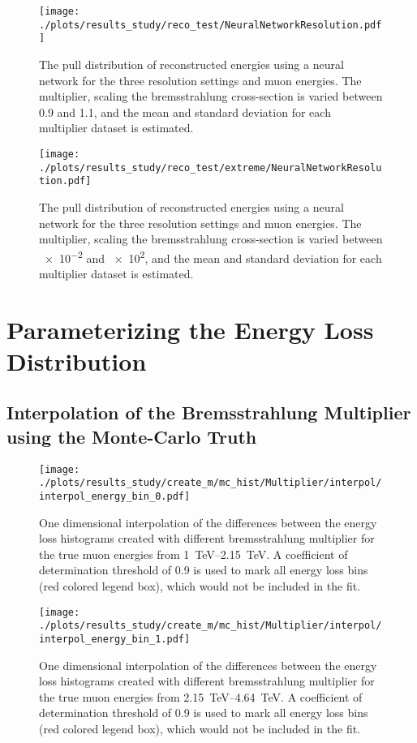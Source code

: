 \begin{figure}[H]
    \centering
    \texttt{[image: ./plots/results\_study/reco\_test/NeuralNetworkResolution.pdf]}
    \caption{The pull distribution of reconstructed energies using a neural network for the three resolution settings and muon energies. The multiplier, scaling the bremsstrahlung cross-section is varied between \num{0.9} and \num{1.1}, and the mean and standard deviation for each multiplier dataset is estimated.}
    \label{fig:study_ereco_pull_nn}
\end{figure}

\begin{figure}[H]
    \centering
    \texttt{[image: ./plots/results\_study/reco\_test/extreme/NeuralNetworkResolution.pdf]}
    \caption{The pull distribution of reconstructed energies using a neural network for the three resolution settings and muon energies. The multiplier, scaling the bremsstrahlung cross-section is varied between \num{e-2} and \num{e2}, and the mean and standard deviation for each multiplier dataset is estimated.}
    \label{fig:study_ereco_pull_nn_extreme}
\end{figure}

%

\section{Parameterizing the Energy Loss Distribution} \label{sec:study_append_interpol}

\subsection{Interpolation of the Bremsstrahlung Multiplier using the Monte-Carlo Truth}

\begin{figure}[H]
    \centering
    \texttt{[image: ./plots/results\_study/create\_m/mc\_hist/Multiplier/interpol/interpol\_energy\_bin\_0.pdf]}
    \caption{One dimensional interpolation of the differences between the energy loss histograms created with different bremsstrahlung multiplier for the true muon energies from \SIrange{1}{2.15}{TeV}. A coefficient of determination threshold of \num{0.9} is used to mark all energy loss bins (red colored legend box), which would not be included in the fit.}
    \label{fig:study_1d_interpol_mu0_mc}
\end{figure}

\begin{figure}[H]
    \centering
    \texttt{[image: ./plots/results\_study/create\_m/mc\_hist/Multiplier/interpol/interpol\_energy\_bin\_1.pdf]}
    \caption{One dimensional interpolation of the differences between the energy loss histograms created with different bremsstrahlung multiplier for the true muon energies from \SIrange{2.15}{4.64}{TeV}. A coefficient of determination threshold of \num{0.9} is used to mark all energy loss bins (red colored legend box), which would not be included in the fit.}
    \label{fig:study_1d_interpol_mu1_mc}
\end{figure}

